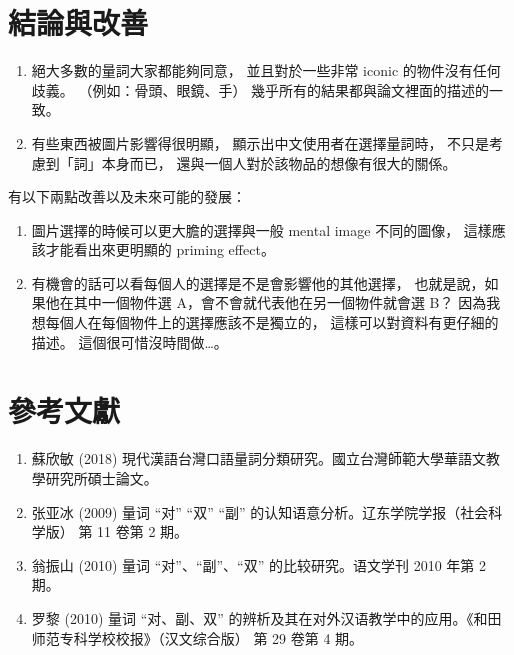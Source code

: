 \documentclass[10pt,a4paper]{article}
\begin{document}
\section{結論與改善} %

\begin{enumerate}[label = \arabic*.]
	\item
		絕大多數的量詞大家都能夠同意，
		並且對於一些非常 iconic 的物件沒有任何歧義。
		（例如：骨頭、眼鏡、手）
		幾乎所有的結果都與論文裡面的描述的一致。
	\item
		有些東西被圖片影響得很明顯，
		顯示出中文使用者在選擇量詞時，
		不只是考慮到「詞」本身而已，
		還與一個人對於該物品的想像有很大的關係。
\end{enumerate}

\noindent
有以下兩點改善以及未來可能的發展：

\begin{enumerate}[label = \arabic*.]
	\item
		圖片選擇的時候可以更大膽的選擇與一般 mental image 不同的圖像，
		這樣應該才能看出來更明顯的 priming effect。
	\item
		有機會的話可以看每個人的選擇是不是會影響他的其他選擇，
		也就是說，如果他在其中一個物件選 A，會不會就代表他在另一個物件就會選 B？
		因為我想每個人在每個物件上的選擇應該不是獨立的，
		這樣可以對資料有更仔細的描述。
		這個很可惜沒時間做…。
\end{enumerate}

\section{參考文獻} %

\begin{enumerate}[label = \arabic*.]
	\item 蘇欣敏 (2018) 現代漢語台灣口語量詞分類研究。國立台灣師範大學華語文教學研究所碩士論文。
	\item 张亚冰 (2009) 量词 “对” “双” “副” 的认知语意分析。辽东学院学报（社会科学版） 第 11 卷第 2 期。
	\item 翁振山 (2010) 量词 “对”、“副”、“双” 的比较研究。语文学刊 2010 年第 2 期。
	\item 罗黎 (2010) 量词 “对、副、双” 的辨析及其在对外汉语教学中的应用。《和田师范专科学校校报》（汉文综合版） 第 29 卷第 4 期。
\end{enumerate}
\end{document}
